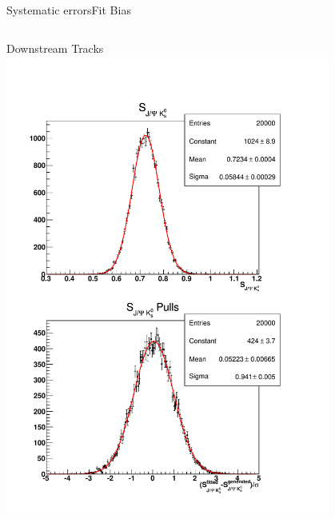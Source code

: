 \documentclass{beamer}
\begin{document}
\begin{frame}{Systematic errors}{Fit Bias}
\begin{columns}
\begin{block}{Downstream Tracks}
	\includegraphics[width=0.8\textwidth]{fit_bias_ds}
	\end{block}
	\end{columns}
	\end{frame}
	
\end{document}
